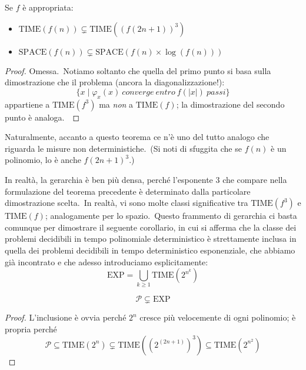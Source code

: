 \begin{theorem} 
    \label{gerarchia_space-time}
    Se $f$ è appropriata:
    \begin{itemize}
        \itemsep 0px
        \item $\mathrm{TIME}(f(n)) \subsetneq \mathrm{TIME}((f(2n+1))^3)$
        \item $\mathrm{SPACE}(f(n)) \subsetneq \mathrm{SPACE}(f(n) \times \log(f(n)))$
    \end{itemize}
\end{theorem}

\begin{proof}
    Omessa.\
    Notiamo soltanto che quella del primo punto si basa sulla dimostrazione che il problema (ancora la diagonalizzazione!):
    \[\{x \mid \varphi_x(x)\ \mathit{converge\ entro}\ f(|x|)\ \mathit{passi}\}\]
    appartiene a $\mathrm{TIME}(f^3)$ ma \textit{non} a $\mathrm{TIME}(f)$; la dimostrazione del secondo punto è analoga.\
\end{proof}

\noindent Naturalmente, accanto a questo teorema ce n'è uno del tutto analogo che riguarda le misure non deterministiche.\
(Si noti di sfuggita che se $f(n)$ è un polinomio, lo è anche $f(2n + 1)^3$.)

\medskip
\noindent In realtà, la gerarchia è ben più densa, perché l'esponente 3 che compare nella formulazione del teorema precedente è determinato dalla particolare dimostrazione scelta.\
In realtà, vi sono molte classi significative tra $\mathrm{TIME}(f^3)$ e $\mathrm{TIME}(f)$; analogamente per lo spazio.\
Questo frammento di gerarchia ci basta comunque per dimostrare il seguente corollario, in cui si afferma che la classe dei problemi decidibili in tempo polinomiale deterministico è strettamente inclusa in quella dei problemi decidibili in tempo deterministico esponenziale, che abbiamo già incontrato e che adesso introduciamo esplicitamente:
\[\mathrm{EXP} = \bigcup_{k \geq 1} \mathrm{TIME} \left(2^{n^k}\right)\]

\begin{corollario}
    \[\mathcal{P} \subsetneq \mathrm{EXP}\]
\end{corollario}

\begin{proof}
    L'inclusione è ovvia perché $2^n$ cresce più velocemente di ogni polinomio; è propria perché
    \[\mathcal{P} \subseteq \mathrm{TIME}(2^n) \subsetneq \mathrm{TIME}\left(\left(2^{(2n+1)}\right)^3\right) \subseteq \mathrm{TIME}\left(2^{n^2}\right)\]
\end{proof}

